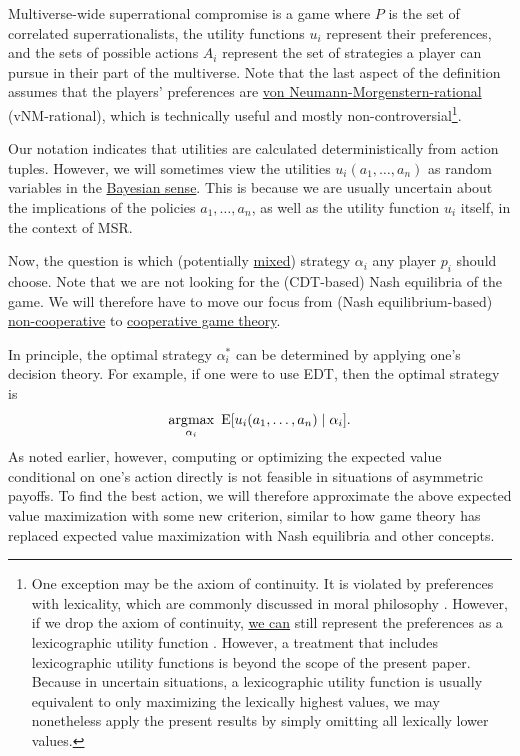 Multiverse-wide superrational compromise is a game where \(P\) is the
set of correlated superrationalists, the utility functions \(u_{i}\)
represent their preferences, and the sets of possible actions \(A_{i}\)
represent the set of strategies a player can pursue in their part of the
multiverse. Note that the last aspect of the definition assumes that the
players' preferences are
\href{https://en.wikipedia.org/wiki/Von_Neumann\%E2\%80\%93Morgenstern_utility_theorem\#The_axioms}{von
Neumann-Morgenstern-rational} (vNM-rational), which is technically
useful and mostly non-controversial\footnote{One exception may be the
  axiom of continuity. It is violated by preferences with lexicality,
  which are commonly discussed in moral philosophy
  \parencite{Knutsson2016-kd}. However, if we drop the axiom
  of continuity,
  \href{https://casparoesterheld.com/2016/08/08/lexicographic-utility-functions/}{we
  can} still represent the preferences as a lexicographic utility
  function \parencite{Blume1989-fd,Fishburn1971-bx}.
  However, a treatment that includes lexicographic utility functions is
  beyond the scope of the present paper. Because in uncertain
  situations, a lexicographic utility function is usually equivalent to
  only maximizing the lexically highest values, we may nonetheless apply
  the present results by simply omitting all lexically lower values.}.

Our notation indicates that utilities are calculated deterministically
from action tuples. However, we will sometimes view the utilities
\(u_{i}(a_{1},\dotsc,a_{n})\) as random variables in the
\href{https://en.wikipedia.org/wiki/Bayesian_probability}{Bayesian
sense}. This is because we are usually uncertain about the implications
of the policies \(a_{1},\dotsc,a_{n}\), as well as the utility function
\(u_{i}\) itself, in the context of MSR.

Now, the question is which (potentially
\href{https://en.wikipedia.org/wiki/Strategy_(game_theory)\#Mixed_strategy}{mixed})
strategy \(\alpha_{i}\) any player \(p_{i}\) should choose. Note that we
are not looking for the (CDT-based) Nash equilibria of the game. We will
therefore have to move our focus from (Nash equilibrium-based)
\href{https://en.wikipedia.org/wiki/Non-cooperative_game_theory}{non-cooperative}
to
\href{https://en.wikipedia.org/wiki/Cooperative_game_theory}{cooperative
game theory}.

In principle, the optimal strategy \(\alpha_{i}^{*}\) can be determined
by applying one's decision theory. For example, if one were to use EDT,
then the optimal strategy is
$$
\operatorname*{\arg\!\max}_{\alpha_{i}}\ \mathrm{E}\lbrack u_{i}(a_{1},\dotsc,a_{n})\mid \alpha_{i}\rbrack.
$$
As noted earlier, however, computing or optimizing the expected value
conditional on one's action directly is not feasible in situations of
asymmetric payoffs. To find the best action, we will therefore
approximate the above expected value maximization with some new
criterion, similar to how game theory has replaced expected value
maximization with Nash equilibria and other concepts.

